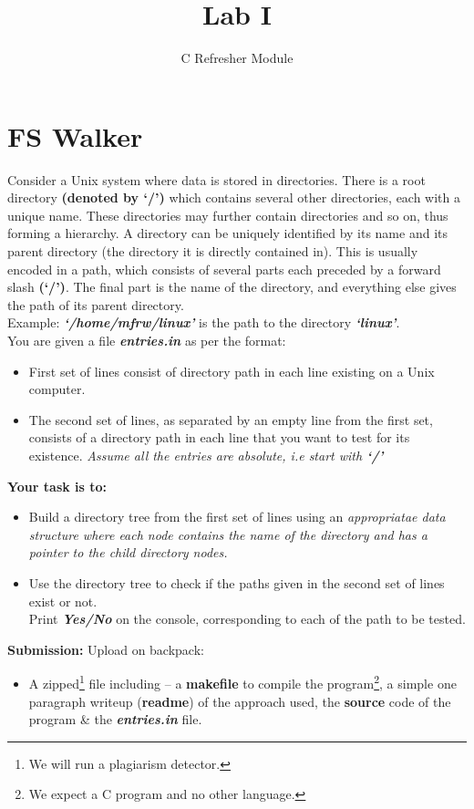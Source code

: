 \documentclass[9pt]{article}
\begin{document}
\title{Lab I}
\author{C Refresher Module}

\maketitle

\section{FS Walker}
Consider a Unix system where data is stored in directories. There is a root directory \textbf{(denoted by ‘/’)} which contains several other directories, each with a unique name. 
These directories may further contain directories and so on, thus forming a hierarchy. A directory can be uniquely identified by its name and its parent directory (the directory 
it is directly contained in). This is usually encoded in a path, which consists of several parts each preceded by a forward slash \textbf{(`/')}. The final part is the name of the directory, 
and everything else gives the path of its parent directory. \\
Example: \textit{\textbf{`/home/mfrw/linux'}} is the path to the directory \textit{\textbf{`linux'}}. \\

You are given a file \textit{\textbf{entries.in}} as per the format:
\begin{itemize}
	\item First set of lines consist of directory path in each line existing on a Unix computer.
	\item The second set of lines, as separated by an empty line from the first set, consists of a directory path in each line that you want to test for its existence.
		\em{Assume all the entries are absolute, i.e start with \textbf{`/'}} \em
\end{itemize}
\textbf{Your task is to:}
\begin{itemize}
	\item Build a directory tree from the first set of lines using an \em{appropriatae} \em data structure where each node contains the name of the directory and has a pointer to the child directory nodes.
	\item Use the directory tree to check if the paths given in the second set of lines exist or not.\\
		Print \textit{\textbf{Yes/No}} on the console, corresponding to each of the path to be tested.
\end{itemize}
\renewcommand{\thefootnote}{\fnsymbol{footnote}}
\textbf{Submission:} Upload on backpack:
\begin{itemize}
	\item A zipped\footnote[2]{We will run a plagiarism detector.} file including -- a \textbf{makefile} to compile the program\footnote[3]{We expect a C program and no other language.},
	a simple one paragraph writeup (\textbf{readme}) of the approach used,
		the \textbf{source} code of the program \& the \textit{\textbf{entries.in}} file.
\end{itemize}
\end{document}
